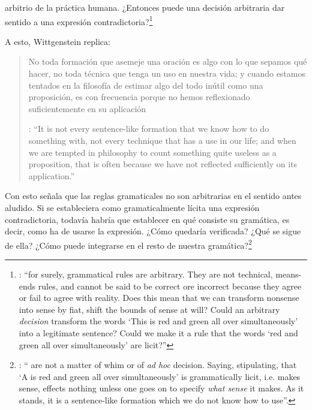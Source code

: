arbitrio de la práctica humana. ¿Entonces puede una decisión arbitraria dar sentido a una expresión contradictoria?\footnote{\cite[Cf.][216]{hacker2000mind}: \enquote{for surely, grammatical rules are arbitrary. They are not technical, means-ends rules, and cannot be said to be correct ore incorrect because they agree or fail to agree with reality. Does this mean that we can transform nonsense into sense by fiat, shift the bounds of sense at will? Could an arbitrary \emph{decision} transform the words `This is red and green all over simultaneously' into a legitimate sentence? Could we make it a rule that the words `red and green all over simultaneously' are licit?}}

A esto, Wittgenstein replica: \blockquote[{\Cite[\S520]{wittgenstein1953phiinv}}: \enquote{It is not every sentence-like formation that we know how to do something with, not every technique that has a use in our life; and when we are tempted in philosophy to count something quite useless as a proposition, that is often because we have not reflected sufficiently on its application.}]{No toda formación que asemeje una oración es algo con lo que sepamos qué hacer, no toda técnica que tenga un uso en nuestra vida; y cuando estamos tentados en la filosofía de estimar algo del todo inútil como una proposición, es con frecuencia porque no hemos reflexionado suficientemente en su aplicación}. Con esto señala que las reglas gramaticales no son arbitrarias en el sentido antes aludido. Si se estableciera como gramaticalmente lícita una expresión contradictoria, todavía habría que establecer en qué consiste su gramática, es decir, como ha de usarse la expresión. ¿Cómo quedaría verificada? ¿Qué se sigue de ella? ¿Cómo puede integrarse en el resto de nuestra gramática?\footnote{\cite[Cf.][216]{hacker2000mind}: \enquote{ are not a matter of whim or of \emph{ad hoc} decision. Saying, stipulating, that `A is red and green all over simultaneously' is grammatically licit, i.e. makes sense, effects nothing unless one goes on to specify \emph{what sense} it makes. As it stands, it is a sentence-like formation which we do not know how to use}.}
